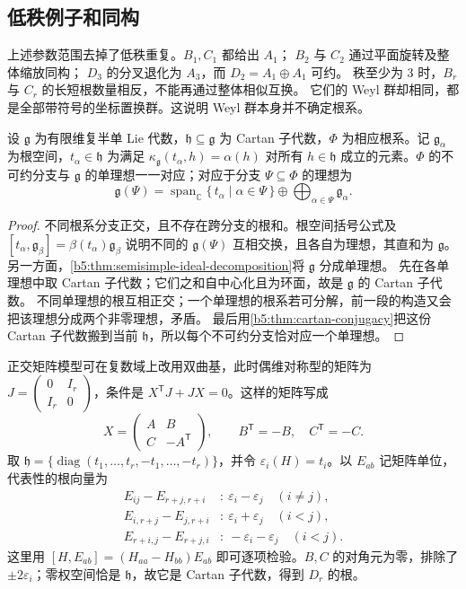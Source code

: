 \subsection{低秩例子和同构}
\label{b5:subsec:1703:03}

上述参数范围去掉了低秩重复。\(B_1,C_1\) 都给出 \(A_1\)； \(B_2\) 与 \(C_2\) 通过平面旋转及整体缩放同构； \(D_3\) 的分叉退化为 \(A_3\)，而 \(D_2=A_1\oplus A_1\) 可约。 秩至少为 \(3\) 时，\(B_r\) 与 \(C_r\) 的长短根数量相反，不能再通过整体相似互换。 它们的 Weyl 群却相同，都是全部带符号的坐标置换群。这说明 Weyl 群本身并不确定根系。

\begin{proposition}\label{b5:prop:root-components-simple-ideals}
	设 \(\mathfrak g\) 为有限维复半单 Lie 代数，\(\mathfrak h\subseteq\mathfrak g\) 为 Cartan 子代数，\(\Phi\) 为相应根系。记 \(\mathfrak g_\alpha\) 为根空间，\(t_\alpha\in\mathfrak h\) 为满足 \(\kappa_{\mathfrak g}(t_\alpha,h)=\alpha(h)\) 对所有 \(h\in\mathfrak h\) 成立的元素。\(\Phi\) 的不可约分支与 \(\mathfrak g\) 的单理想一一对应；对应于分支 \(\Psi\subseteq\Phi\) 的理想为
	\[
		\mathfrak g(\Psi) =\operatorname{span}_{\mathbb C}\{\,t_\alpha\mid\alpha\in\Psi\,\} \oplus\bigoplus_{\alpha\in\Psi}\mathfrak g_\alpha.
	\]
\end{proposition}
\begin{proof}
	不同根系分支正交，且不存在跨分支的根和。根空间括号公式及 \([t_\alpha,\mathfrak g_\beta]=\beta(t_\alpha)\mathfrak g_\beta\) 说明不同的 \(\mathfrak g(\Psi)\) 互相交换，且各自为理想，其直和为 \(\mathfrak g\)。 另一方面，\cref{b5:thm:semisimple-ideal-decomposition}将 \(\mathfrak g\) 分成单理想。 先在各单理想中取 Cartan 子代数；它们之和自中心化且为环面，故是 \(\mathfrak g\) 的 Cartan 子代数。 不同单理想的根互相正交；一个单理想的根系若可分解，前一段的构造又会把该理想分成两个非零理想，矛盾。 最后用\cref{b5:thm:cartan-conjugacy}把这份 Cartan 子代数搬到当前 \(\mathfrak h\)，所以每个不可约分支恰对应一个单理想。
\end{proof}

正交矩阵模型可在复数域上改用双曲基，此时偶维对称型的矩阵为 \(J=\left(\begin{smallmatrix}0&I_r\\I_r&0\end{smallmatrix}\right)\)，条件是 \(X^{\mathsf T}J+JX=0\)。这样的矩阵写成
\[
	X=\begin{pmatrix}A&B\\C&-A^{\mathsf T}\end{pmatrix},
	\qquad B^{\mathsf T}=-B,\quad C^{\mathsf T}=-C.
\]
取 \(\mathfrak h=\{\operatorname{diag}(t_1,\ldots,t_r,-t_1,\ldots,-t_r)\}\)，并令 \(\varepsilon_i(H)=t_i\)。以 \(E_{ab}\) 记矩阵单位，代表性的根向量为
\[
	\begin{aligned}
		E_{ij}-E_{r+j,r+i}&:\ \varepsilon_i-\varepsilon_j\quad(i\ne j),\\
		E_{i,r+j}-E_{j,r+i}&:\ \varepsilon_i+\varepsilon_j\quad(i<j),\\
		E_{r+i,j}-E_{r+j,i}&:\ -\varepsilon_i-\varepsilon_j\quad(i<j).
	\end{aligned}
\]
这里用 \([H,E_{ab}]=(H_{aa}-H_{bb})E_{ab}\) 即可逐项检验。\(B,C\) 的对角元为零，排除了 \(\pm2\varepsilon_i\)；零权空间恰是 \(\mathfrak h\)，故它是 Cartan 子代数，得到 \(D_r\) 的根。

